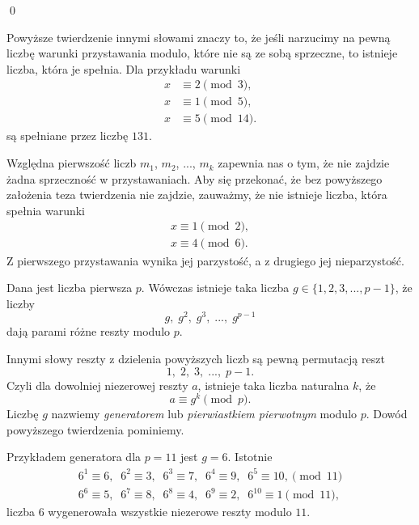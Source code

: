 \qed
\vspace{5px}

\noindent
Powyższe twierdzenie innymi słowami znaczy to, że jeśli narzucimy na pewną liczbę warunki przystawania modulo, które nie są ze sobą sprzeczne, to istnieje liczba, która je spełnia. Dla przykładu warunki
\begin{align*}
	x &\equiv 2 \pmod{3}, \\
	x &\equiv 1 \pmod{5}, \\
	x &\equiv 5 \pmod{14}.
\end{align*}
są spełniane przez liczbę $131$.

\vspace{10px}

\noindent
Względna pierwszość liczb $m_1$, $m_2$, ..., $m_k$ zapewnia nas o tym, że nie zajdzie żadna sprzeczność w przystawaniach. Aby się przekonać, że bez powyższego założenia teza twierdzenia nie zajdzie, zauważmy, że nie istnieje liczba, która spełnia warunki
\begin{gather*}
	x \equiv 1 \pmod{2}, \\
	x \equiv 4 \pmod{6}.
\end{gather*}
Z pierwszego przystawania wynika jej parzystość, a z drugiego jej nieparzystość.

\vspace{10px}


\noindent
Dana jest liczba pierwsza $p$. Wówczas istnieje taka liczba $g \in \{1, 2, 3, ..., p - 1\}$, że liczby 
\[
	g,\; g^2,\; g^3,\; ...,\; g^{p - 1}
\]
dają parami różne reszty modulo $p$.

\vspace{20px}

\noindent
Innymi słowy reszty z dzielenia powyższych liczb są pewną permutacją reszt
\[
	1,\; 2,\; 3,\; ...,\;  p - 1.
\]
Czyli dla dowolniej niezerowej reszty $a$, istnieje taka liczba naturalna $k$, że 
\[
	a \equiv g^k \pmod{p}.
\]
Liczbę $g$ nazwiemy \textit{generatorem} lub \textit{pierwiastkiem pierwotnym} modulo $p$. Dowód powyższego twierdzenia pominiemy.

\vspace{10px}

\noindent
Przykładem generatora dla $p = 11$ jest $g = 6$. Istotnie
\begin{gather*}
	6^1 \equiv 6, \;\; 6^2 \equiv 3, \;\; 6^3 \equiv 7, \;\;
	6^4 \equiv 9, \;\; 6^5 \equiv 10, \pmod{11} \\
	 6^6 \equiv 5, \;\;
	6^7 \equiv 8, \;\; 6^8 \equiv 4, \;\; 6^9 \equiv 2, \;\; 6^{10} \equiv 1 \pmod{11},
\end{gather*}
liczba $6$ wygenerowała wszystkie niezerowe reszty modulo $11$.


